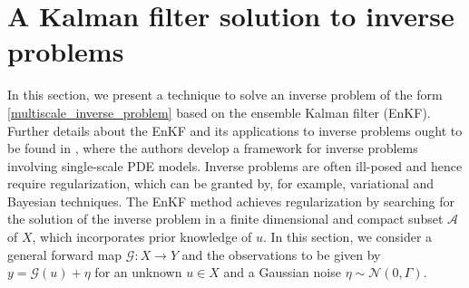 \section{A Kalman filter solution to inverse problems}\label{Kalman}

In this section, we present a technique to solve an inverse problem of the form \eqref{multiscale_inverse_problem} based on the ensemble Kalman filter (EnKF). Further details about the EnKF and its applications to inverse problems ought to be found in \cite{ILS13, ScS17}, where the authors develop a framework for inverse problems involving single-scale PDE models. Inverse problems are often ill-posed and hence require regularization, which can be granted by, for example, variational and Bayesian techniques. The EnKF method achieves regularization by searching for the solution of the inverse problem in a finite dimensional and compact subset $\mathcal{A}$ of $X$, which incorporates prior knowledge of $u$. In this section, we consider a general forward map $\mathcal G \colon X \to Y$ and the observations to be given by $y = \mathcal G(u) + \eta$ for an unknown $u \in X$ and a Gaussian noise $\eta \sim \mathcal N(0, \Gamma)$.

